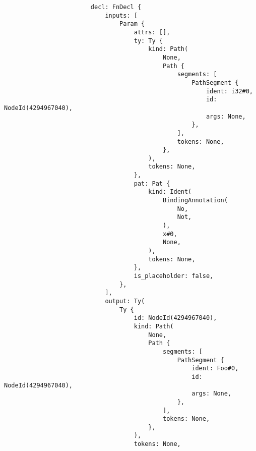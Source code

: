 \begin{verbatim}
                        decl: FnDecl {
                            inputs: [
                                Param {
                                    attrs: [],
                                    ty: Ty {
                                        kind: Path(
                                            None,
                                            Path {
                                                segments: [
                                                    PathSegment {
                                                        ident: i32#0,
                                                        id: NodeId(4294967040),
                                                        args: None,
                                                    },
                                                ],
                                                tokens: None,
                                            },
                                        ),
                                        tokens: None,
                                    },
                                    pat: Pat {
                                        kind: Ident(
                                            BindingAnnotation(
                                                No,
                                                Not,
                                            ),
                                            x#0,
                                            None,
                                        ),
                                        tokens: None,
                                    },
                                    is_placeholder: false,
                                },
                            ],
                            output: Ty(
                                Ty {
                                    id: NodeId(4294967040),
                                    kind: Path(
                                        None,
                                        Path {
                                            segments: [
                                                PathSegment {
                                                    ident: Foo#0,
                                                    id: NodeId(4294967040),
                                                    args: None,
                                                },
                                            ],
                                            tokens: None,
                                        },
                                    ),
                                    tokens: None,

\end{verbatim}
